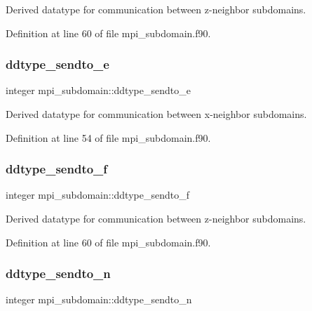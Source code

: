 Derived datatype for communication between z-\/neighbor subdomains. 



Definition at line 60 of file mpi\+\_\+subdomain.\+f90.

\mbox{\label{namespacempi__subdomain_a93395266b1630e5a91e8e89531dfcec6}} 
\subsubsection{\texorpdfstring{ddtype\_sendto\_e}{ddtype\_sendto\_e}}
{\footnotesize\ttfamily integer mpi\+\_\+subdomain\+::ddtype\+\_\+sendto\+\_\+e}



Derived datatype for communication between x-\/neighbor subdomains. 



Definition at line 54 of file mpi\+\_\+subdomain.\+f90.

\mbox{\label{namespacempi__subdomain_a4f3d66535b947c7afee75e6e73a47206}} 
\subsubsection{\texorpdfstring{ddtype\_sendto\_f}{ddtype\_sendto\_f}}
{\footnotesize\ttfamily integer mpi\+\_\+subdomain\+::ddtype\+\_\+sendto\+\_\+f}



Derived datatype for communication between z-\/neighbor subdomains. 



Definition at line 60 of file mpi\+\_\+subdomain.\+f90.

\mbox{\label{namespacempi__subdomain_a55f5c1af9bd941fd176e619bddbb8d82}} 
\subsubsection{\texorpdfstring{ddtype\_sendto\_n}{ddtype\_sendto\_n}}
{\footnotesize\ttfamily integer mpi\+\_\+subdomain\+::ddtype\+\_\+sendto\+\_\+n}



